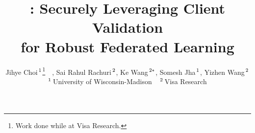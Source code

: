 \documentclass[11pt]{article}
\begin{document}
\title{\ours: Securely Leveraging Client Validation \\ for Robust Federated Learning}
\author{
Jihye Choi$\hspace{.5mm}^1$\thanks{Work done while at Visa Research.}~~,   
Sai Rahul Rachuri$\hspace{.5mm}^2$, 
Ke Wang$\hspace{.5mm}^{2 *}$, 
Somesh Jha$\hspace{.5mm}^1$,
Yizhen Wang$\hspace{.5mm}^2$ \\
$^1\hspace{.5mm}$University of Wisconsin-Madison ~ $^2\hspace{.5mm}$Visa Research}








\newcommand{\fix}{\marginpar{FIX}}
\newcommand{\new}{\marginpar{NEW}}


\let\oldcite\cite
\renewcommand{\cite}{\citep}

\maketitle




















\newpage
\appendix
\onecolumn





\end{document}

